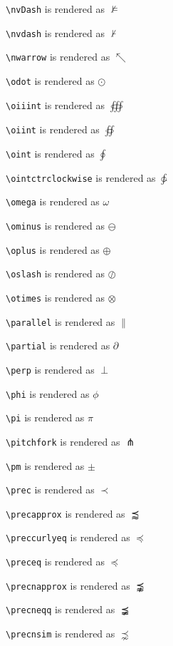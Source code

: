 \texttt{\textbackslash nvDash} is rendered as $\nvDash$

\texttt{\textbackslash nvdash} is rendered as $\nvdash$

\texttt{\textbackslash nwarrow} is rendered as $\nwarrow$

\texttt{\textbackslash odot} is rendered as $\odot$

\texttt{\textbackslash oiiint} is rendered as $\oiiint$

\texttt{\textbackslash oiint} is rendered as $\oiint$

\texttt{\textbackslash oint} is rendered as $\oint$

\texttt{\textbackslash ointctrclockwise} is rendered as $\ointctrclockwise$

\texttt{\textbackslash omega} is rendered as $\omega$

\texttt{\textbackslash ominus} is rendered as $\ominus$

\texttt{\textbackslash oplus} is rendered as $\oplus$

\texttt{\textbackslash oslash} is rendered as $\oslash$

\texttt{\textbackslash otimes} is rendered as $\otimes$

\texttt{\textbackslash parallel} is rendered as $\parallel$

\texttt{\textbackslash partial} is rendered as $\partial$

\texttt{\textbackslash perp} is rendered as $\perp$

\texttt{\textbackslash phi} is rendered as $\phi$

\texttt{\textbackslash pi} is rendered as $\pi$

\texttt{\textbackslash pitchfork} is rendered as $\pitchfork$

\texttt{\textbackslash pm} is rendered as $\pm$

\texttt{\textbackslash prec} is rendered as $\prec$

\texttt{\textbackslash precapprox} is rendered as $\precapprox$

\texttt{\textbackslash preccurlyeq} is rendered as $\preccurlyeq$

\texttt{\textbackslash preceq} is rendered as $\preceq$

\texttt{\textbackslash precnapprox} is rendered as $\precnapprox$

\texttt{\textbackslash precneqq} is rendered as $\precneqq$

\texttt{\textbackslash precnsim} is rendered as $\precnsim$

